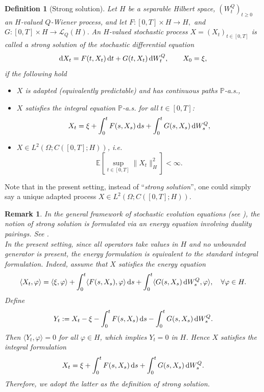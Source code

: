 \documentclass[12pt]{amsart}
\newcommand{\D}[1]{\mbox{\rm #1}}
\newcommand{\dd}{\D{d}}
\numberwithin{equation}{section}
\newtheorem{remark}[theorem]{Remark}
\newtheorem{definition}[theorem]{Definition}
\begin{document}
\begin{definition}[Strong solution]\label{def:solution in H}
Let $H$ be a separable Hilbert space,  $(W_t^Q)_{t\geq0}$  an $H$-valued $Q$-Wiener process, and let $F:[0,T]\times H \to H,$ and $G:[0,T]\times H \to \mathscr L_Q(H).$ 
An $H$-valued stochastic process $X=(X_t)_{t\in[0,T]}$ is called a strong solution of the stochastic differential equation
\[
    \dd X_t = F(t,X_t)\,\dd t + G(t,X_t)\,\dd W_t^Q, \qquad X_0=\xi,
\]
if the following hold
\begin{itemize}
\item $X$ is adapted (equivalently predictable) and has continuous paths $\mathbb{P}$-a.s.,
\item $X$ satisfies the integral equation $\mathbb{P}$-a.s. for all $t\in[0,T]$:
\[
    X_t = \xi + \int_0^t F(s,X_s)\,\dd s + \int_0^t G(s,X_s)\,\dd W_s^Q,
\]
\item $X \in L^2(\Omega;C([0,T];H))$, i.e.
\[
    \mathbb{E}\left[\sup_{t\in[0,T]} \|X_t\|_H^2\right] < \infty.
\]
\end{itemize}
\end{definition}

Note that in the present setting, instead of ``\textit{strong solution}'', one could simply say a unique adapted process $X \in L^2(\Omega;C([0,T];H))$.

\begin{remark}
In the general framework of stochastic evolution equations (see \cite[\S 6.7, page 197]{chow2007stochastic}), the notion of strong solution is formulated via an energy equation involving duality pairings. See \cite[equ.(6.118), page 198]{chow2007stochastic}. \\
In the present setting, since all operators take values in $H$ and no unbounded generator is present, the energy formulation is equivalent to the standard integral formulation. 
Indeed, assume that $X$ satisfies the energy equation
\[
    \langle X_t, \varphi \rangle = \langle \xi, \varphi \rangle + \int_0^t \langle F(s,X_s), \varphi \rangle\,\dd s + \int_0^t \langle G(s,X_s)\,\dd W_s^Q, \varphi \rangle, \quad \forall \varphi \in H.
\]
Define
\[
    Y_t := X_t - \xi - \int_0^t F(s,X_s)\,\dd s - \int_0^t G(s,X_s)\,\dd W_s^Q.
\]
Then $\langle Y_t,\varphi\rangle = 0$ for all $\varphi \in H$, which implies $Y_t=0$ in $H$. Hence $X$ satisfies the integral formulation
\[
    X_t = \xi + \int_0^t F(s,X_s)\,\dd s + \int_0^t G(s,X_s)\,\dd W_s^Q.
\]
Therefore, we adopt the latter as the definition of strong solution.
\end{remark}
\end{document}
